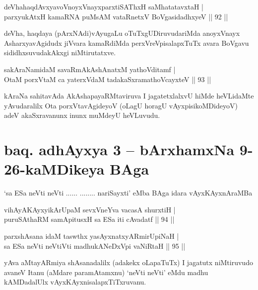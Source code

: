 \begin{shl}
deVhahaqdAvxyavoV\s noyxVnayxparxtiSAThxH saMhatatavxtaH |\\
parxyukAtxH kamaRNA puMsAM vataRnetxV BoVgasidadhxyeV \hfill || 92 ||
\end{shl}

\begin{artha}%
deVha, haqdaya (pArxNAdi)vAyugaLu oTuTxgUDiruvudariMda anoyxVnayx AsharxyavAgidudx jiVvara kamaRdiMda perxVreVpisalapxTuTx avara BoVgavu sididhxsuvudakAkxgi niMtirutatxve.
\end{artha}

\begin{shl}
sakAraNamidaM savaRmAkAshAnatxM yathoVditamf |\\
OtaM porxVtaM ca yaterxVdaM tadakaSxramathoVcayxteV \hfill || 93 ||
\end{shl}

\begin{artha}
kAraNa sahitavAda AkAshapayaRMtaviruva I jagatetxlalxvU hiMde heVLidaMte yAvudaralilx Ota porxVtavAgideyoV (oLagU horagU vAyxpisikoMDideyoV) adeV akaSxravanunx inunx muMdeyU heVLuvudu.
\end{artha}

\section*{baq. adhAyxya 3 -- bArxhamxNa 9-26-kaMDikeya BAga}

\begin{shl}
`sa ESa neVti neVti ...... ........ nariSayxti' eMba BAga idara vAyxKAyxnAraMBa
\end{shl}

\begin{shl}
vihAyA\s \s KAyxyikArUpaM sevxVneYva vacasA shurxtiH |\\
puruSAthaRM samApitusxH sa ESa iti cAvadatf \hfill || 94 ||
\end{shl}

\begin{shl}
parxshAsana idaM taswthx yasAyxnatxyARmirUpiNaH |\\
sa ESa neVti neVtiVti madhukANeDxV\s pi vaNiRtaH \hfill || 95 ||
\end{shl}

\begin{artha}
yAva aMtayARmiya shAsanadalilx (adakekx oLapaTuTx) I jagatutx niMtiruvudo avaneV Itanu (aMdare paramAtamxnu) `neVti neVti' eMdu madhu kAMDadalUlx vAyxKAyxnisalapxTiTxruvanu.
\end{artha}

